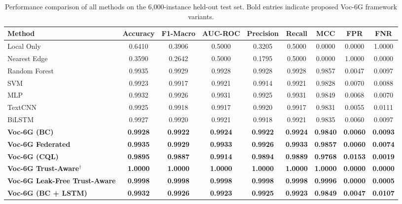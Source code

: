 \documentclass[10pt,letterpaper]{article}
\providecommand{\VocSixG}{Voc-6G}
\begin{document}
\begin{table}[t]
\caption{Performance comparison of all methods on the 6,000-instance held-out test set. Bold entries indicate proposed \VocSixG{} framework variants.\footnotemark}
\label{tab:main_results}
\centering
\small
\begin{tabular}{lcccccccc}
\toprule
\textbf{Method} & \textbf{Accuracy} & \textbf{F1-Macro} & \textbf{AUC-ROC} & \textbf{Precision} & \textbf{Recall} & \textbf{MCC} & \textbf{FPR} & \textbf{FNR} \\
\midrule
Local Only       & 0.6410 & 0.3906 & 0.5000 & 0.3205 & 0.5000 & 0.0000 & 0.0000 & 1.0000 \\
Nearest Edge     & 0.3590 & 0.2642 & 0.5000 & 0.1795 & 0.5000 & 0.0000 & 1.0000 & 0.0000 \\
Random Forest    & 0.9935 & 0.9929 & 0.9928 & 0.9928 & 0.9928 & 0.9857 & 0.0047 & 0.0097 \\
SVM              & 0.9923 & 0.9917 & 0.9921 & 0.9914 & 0.9921 & 0.9828 & 0.0070 & 0.0088 \\
MLP              & 0.9932 & 0.9926 & 0.9931 & 0.9925 & 0.9931 & 0.9849 & 0.0068 & 0.0070 \\
TextCNN          & 0.9925 & 0.9918 & 0.9917 & 0.9920 & 0.9917 & 0.9831 & 0.0055 & 0.0111 \\
BiLSTM           & 0.9927 & 0.9920 & 0.9921 & 0.9918 & 0.9921 & 0.9835 & 0.0060 & 0.0097 \\
\midrule
\textbf{Voc-6G (BC)}              & \textbf{0.9928} & \textbf{0.9922} & \textbf{0.9924} & \textbf{0.9922} & \textbf{0.9924} & \textbf{0.9840} & \textbf{0.0060} & \textbf{0.0093} \\
\textbf{Voc-6G Federated}        & \textbf{0.9935} & \textbf{0.9929} & \textbf{0.9933} & \textbf{0.9926} & \textbf{0.9933} & \textbf{0.9857} & \textbf{0.0060} & \textbf{0.0074} \\
\textbf{Voc-6G (CQL)}            & \textbf{0.9895} & \textbf{0.9887} & \textbf{0.9914} & \textbf{0.9894} & \textbf{0.9889} & \textbf{0.9768} & \textbf{0.0153} & \textbf{0.0019} \\
\textbf{Voc-6G Trust-Aware}$^\dagger$ & \textbf{1.0000} & \textbf{1.0000} & \textbf{1.0000} & \textbf{1.0000} & \textbf{1.0000} & \textbf{1.0000} & \textbf{0.0000} & \textbf{0.0000} \\
\textbf{Voc-6G Leak-Free Trust-Aware} & \textbf{0.9998} & \textbf{0.9998} & \textbf{0.9998} & \textbf{0.9998} & \textbf{0.9998} & \textbf{0.9996} & \textbf{0.0000} & \textbf{0.0005} \\
\textbf{Voc-6G (BC + LSTM)}       & \textbf{0.9932} & \textbf{0.9926} & \textbf{0.9923} & \textbf{0.9925} & \textbf{0.9923} & \textbf{0.9849} & \textbf{0.0047} & \textbf{0.0107} \\
\bottomrule
\end{tabular}

\end{table}
\end{document}
